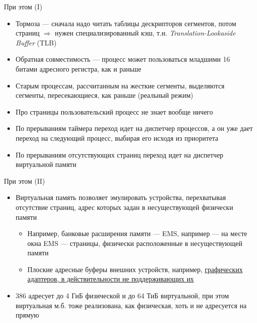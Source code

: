 \documentclass[xetex,aspectratio=43]{beamer}
\begin{document}
\begin{frame}{При этом (I)}
    \begin{itemize}
        \tightlist
        \item
        Тормоза --- сначала надо читать таблицы дескрипторов сегментов, потом
        страниц \(\Rightarrow\) нужен специализированный кэш, т.н. \emph{Translation-Lookaside Buffer} (TLB)
        \item
        Обратная совместимость --- процесс может пользоваться младшими 16
        битами адресного регистра, как и раньше
        \item
        Старым процессам, рассчитанным на жесткие сегменты, выделяются
        сегменты, пересекающиеся, как раньше (реальный режим)
        \item
        Про страницы пользовательский процесс не знает вообще ничего
        \item
        По прерываниям таймера переход идет на диспетчер процессов, а он уже
        дает переход на следующий процесс, выбирая его исходя из приоритета
        \item
        По прерываниям отсутствующих страниц переход идет на диспетчер
        виртуальной памяти
    \end{itemize}
\end{frame}

\begin{frame}{При этом (II)}
    \begin{itemize}
        \tightlist
        \item
        Виртуальная память позволяет эмулировать устройства, перехватывая
        отсутствие страниц, адрес которых задан в несуществующей физически
        памяти

        \begin{itemize}
            \tightlist
            \item
            Например, банковые расширения памяти --- EMS, например --- на месте
            окна EMS --- страницы, физически расположенные в несуществующей
            памяти
            \item
            Плоские адресные буферы внешних устройств, например,
            \href{http://ru.wikipedia.org/wiki/UniVBE}{графических адаптеров, в
                действительности не поддерживающих их}
        \end{itemize}
        \item
        386 адресует до 4 ГиБ физической и до 64 ТиБ виртуальной, при этом
        виртуальная м.б. тоже реализована, как физическая, хоть и не
        адресуется на прямую
    \end{itemize}
\end{frame}
\end{document}
